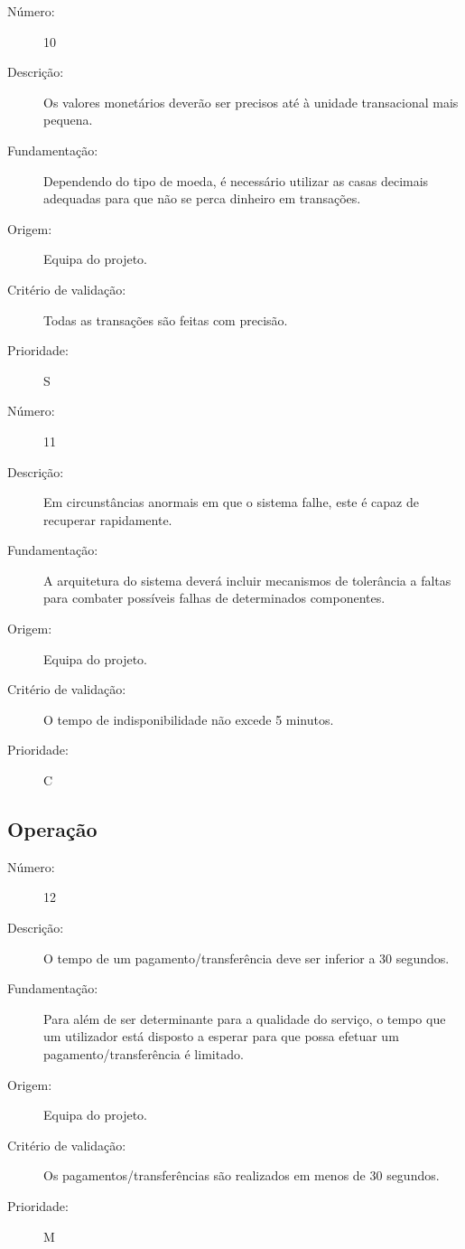 \documentclass{article}
\begin{document}
            \begin{description}
        \item[Número:]10
        \item[Descrição:]Os valores monetários deverão ser precisos até à unidade transacional mais pequena.
        \item[Fundamentação:] Dependendo do tipo de moeda, é necessário utilizar as casas decimais adequadas para que não se perca dinheiro em transações.
        \item[Origem:]Equipa do projeto.
        \item[Critério de validação:]Todas as transações são feitas com precisão.
        \item[Prioridade:]S
      \end{description}
      \vspace{0.5cm}

            \begin{description}
        \item[Número:]11
        \item[Descrição:]Em circunstâncias anormais em que o sistema falhe, este é capaz de recuperar rapidamente.
        \item[Fundamentação:]A arquitetura do sistema deverá incluir mecanismos de tolerância a faltas para combater possíveis falhas de determinados componentes. 
        \item[Origem:]Equipa do projeto.
        \item[Critério de validação:]O tempo de indisponibilidade não excede 5 minutos.
        \item[Prioridade:]C
      \end{description}

  \subsection{Operação}

            \begin{description}
        \item[Número:]12
        \item[Descrição:]O tempo de um pagamento/transferência deve ser inferior a 30 segundos.
        \item[Fundamentação:]Para além de ser determinante para a qualidade do serviço, o tempo que um utilizador está disposto a esperar para que possa efetuar um pagamento/transferência é limitado.
        \item[Origem:]Equipa do projeto.
        \item[Critério de validação:]Os pagamentos/transferências são realizados em menos de 30 segundos.
        \item[Prioridade:]M
      \end{description}
      \vspace{0.5cm}
\end{document}
